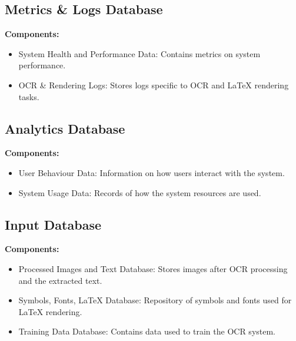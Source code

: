 \documentclass{article}
\begin{document}
\subsection{Metrics \& Logs Database}
\textbf{Components:}
\begin{itemize}
    \item System Health and Performance Data: Contains metrics on system performance.
    \item OCR \& Rendering Logs: Stores logs specific to OCR and LaTeX rendering tasks.
\end{itemize}

\subsection{Analytics Database}
\textbf{Components:}
\begin{itemize}
    \item User Behaviour Data: Information on how users interact with the system.
    \item System Usage Data: Records of how the system resources are used.
\end{itemize}

\subsection{Input Database}
\textbf{Components:}
\begin{itemize}
    \item Processed Images and Text Database: Stores images after OCR processing and the extracted text.
    \item Symbols, Fonts, LaTeX Database: Repository of symbols and fonts used for LaTeX rendering.
    \item Training Data Database: Contains data used to train the OCR system.
\end{itemize}
\end{document}
